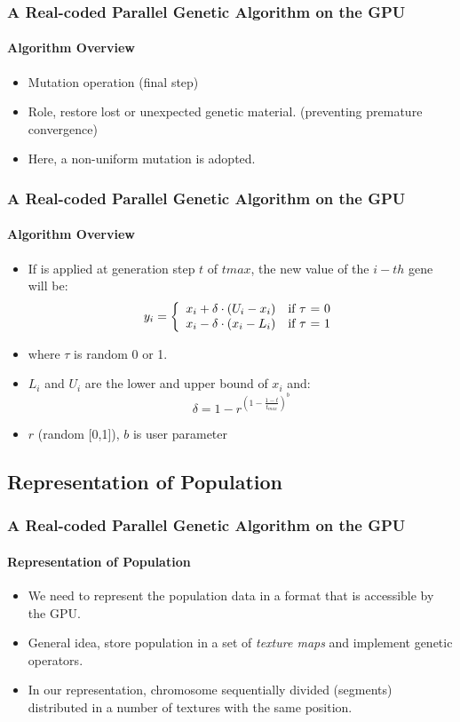 \frame
{
\frametitle{A Real-coded Parallel Genetic Algorithm on the GPU}
\framesubtitle{Algorithm Overview}
\begin{itemize}
	\item Mutation operation (final step)
	\item Role, restore lost or unexpected genetic material. (preventing premature convergence)
	\item Here, a non-uniform mutation is adopted.
\end{itemize}
}

\frame
{
\frametitle{A Real-coded Parallel Genetic Algorithm on the GPU}
\framesubtitle{Algorithm Overview}
\begin{itemize}
	\item If is applied at generation step $t$ of $tmax$, the new value of the $i-th$ gene will be:
    \[
    y_{i} = \left\{ 
        \begin{array}{l l}

		x_{i} + \delta \cdot (U_{i} - x_{i}) & \text{if $\tau$ = 0}\\
		x_{i} - \delta \cdot (x_{i} - L_{i}) & \text{if $\tau$ = 1}\\
        \end{array} \right.
    \]
	\item where $\tau$ is random 0 or 1.
	\item $L_{i}$ and $U_{i}$ are the lower and upper bound of $x_{i}$ and:
	$$\delta = 1 - r^{(1-\frac{1-t}{t_{max}})^{b}}$$
	\item $r$ (random [0,1]), $b$ is user parameter
\end{itemize}
}
\subsection{Representation of Population}
\frame
{
\frametitle{A Real-coded Parallel Genetic Algorithm on the GPU}
\framesubtitle{Representation of Population}
\begin{itemize}
	\item We need to represent the population data in a format that is accessible by the GPU.
	\item General idea, store population in a set of \emph{texture maps} and implement genetic operators.
	\item In our representation, chromosome sequentially divided (segments) distributed in a number of textures with the same position.
\end{itemize}
}

